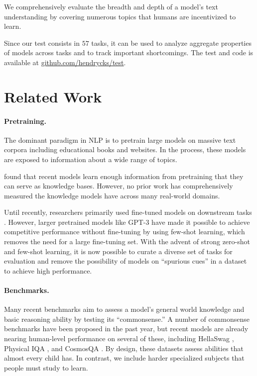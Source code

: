 We comprehensively evaluate the breadth and depth of a model's text understanding by covering numerous topics that humans are incentivized to learn.

Since our test consists in $57$ tasks, it can be used to analyze aggregate properties of models across tasks and to track important shortcomings. The test and code is available at \href{https://github.com/hendrycks/test}{github.com/hendrycks/test}. 

\section{Related Work}
\paragraph{Pretraining.} 
The dominant paradigm in NLP is to pretrain large models on massive text corpora including educational books and websites. In the process, these models are exposed to information about a wide range of topics.

\citet{petroni2019languagemodelsasknowledgebase} found that recent models learn enough information from pretraining that they can serve as knowledge bases. However, no prior work has comprehensively measured the knowledge models have across many real-world domains. 

Until recently, researchers primarily used fine-tuned models on downstream tasks \citep{BERTDevlin2019}. However, larger pretrained models like GPT-3 \citep{brown2020gpt3} have made it possible to achieve competitive performance without fine-tuning by using few-shot learning, which removes the need for a large fine-tuning set. With the advent of strong zero-shot and few-shot learning, it is now possible to curate a diverse set of tasks for evaluation and remove the possibility of models on ``spurious cues'' \citep{geirhos2020shortcut,Hendrycks2019NaturalAE} in a dataset to achieve high performance.

\paragraph{Benchmarks.} 
Many recent benchmarks aim to assess a model's general world knowledge and basic reasoning ability by testing its ``commonsense.'' A number of commonsense benchmarks have been proposed in the past year, but recent models are already nearing human-level performance on several of these, including HellaSwag \citep{zellers2019hellaswag}, Physical IQA \citep{bisk2019physicaliqa}, and CosmosQA \citep{huang2019cosmosqa}. By design, these datasets assess abilities that almost every child has. In contrast, we include harder specialized subjects that people must study to learn. 

